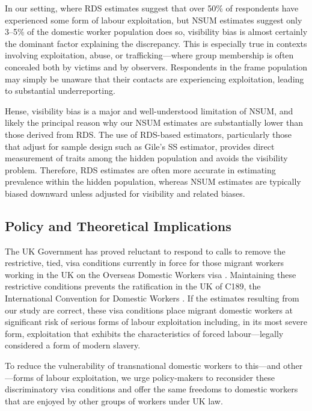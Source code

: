 \documentclass[
  12pt,
  letterpaper,
  DIV=11,
  numbers=noendperiod]{scrartcl}
\theoremstyle{plain}
\theoremstyle{definition}
\begin{document}
In our setting, where RDS estimates suggest that over 50\% of
respondents have experienced some form of labour exploitation, but NSUM
estimates suggest only 3--5\% of the domestic worker population does so,
visibility bias is almost certainly the dominant factor explaining the
discrepancy. This is especially true in contexts involving exploitation,
abuse, or trafficking---where group membership is often concealed both
by victims and by observers. Respondents in the frame population may
simply be unaware that their contacts are experiencing exploitation,
leading to substantial underreporting.

Hense, visibility bias is a major and well-understood limitation of
NSUM, and likely the principal reason why our NSUM estimates are
substantially lower than those derived from RDS. The use of RDS-based
estimators, particularly those that adjust for sample design such as
Gile's SS estimator, provides direct measurement of traits among the
hidden population and avoids the visibility problem. Therefore, RDS
estimates are often more accurate in estimating prevalence within the
hidden population, whereas NSUM estimates are typically biased downward
unless adjusted for visibility and related biases.

\subsection{Policy and Theoretical
Implications}\label{policy-and-theoretical-implications}

The UK Government has proved reluctant to respond to calls to remove the
restrictive, tied, visa conditions currently in force for those migrant
workers working in the UK on the Overseas Domestic Workers visa
\autocite{gower_calls_2016}. Maintaining these restrictive conditions
prevents the ratification in the UK of C189, the International
Convention for Domestic Workers \autocite{ILO11-indicators}. If the
estimates resulting from our study are correct, these visa conditions
place migrant domestic workers at significant risk of serious forms of
labour exploitation including, in its most severe form, exploitation
that exhibits the characteristics of forced labour---legally considered
a form of modern slavery.

To reduce the vulnerability of transnational domestic workers to
this---and other---forms of labour exploitation, we urge policy-makers
to reconsider these discriminatory visa conditions and offer the same
freedoms to domestic workers that are enjoyed by other groups of workers
under UK law.
\end{document}
